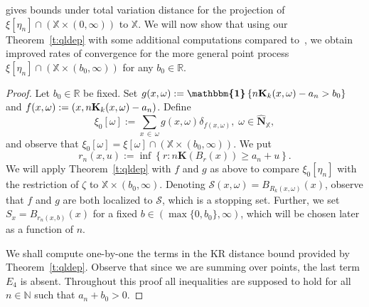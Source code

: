 \documentclass[10pt]{amsart}
\theoremstyle{definition}\newtheorem{defi}[theo]{Definition}\newtheorem{rema}[theo]{Remark}\newtheorem{exam}[theo]{Example}\newtheorem{exem}[theo]{Example}\newtheorem{nota}[theo]{Notation}
\newcommand*\bN{\mathbf{N}}
\newcommand*\bK{\mathbf{K}}
\newcommand*\N{\mathbb{N}}
\newcommand*\R{\mathbb{R}}
\newcommand*\X{\mathbb{X}}
\newcommand*\cS{\mathcal{S}}
\newcommand{\ind}{\boldsymbol{\mathbbm{1}}}
\newcommand{\set}[1]{\left\{#1\right\}}
\begin{document}
\cite[Theorem~4.2]{Otto2020} gives bounds under total variation distance for the projection of $\xi[\eta_n] \cap (\X \times (0,\infty))$ to $\X$. We will now show that using our Theorem~\ref{t:qldep} with some additional computations compared to~\cite[Theorem~4.2]{Otto2020}, we obtain improved rates of convergence for the more general point process $\xi[\eta_n] \cap (\X \times (b_0,\infty))$ for any $b_0 \in \R$.


\begin{proof}
Let $b_0 \in \R$ be fixed. Set $g(x,\omega) := \ind\set{n\bK_k(x,\omega) - a_n > b_0}$ and $f(x,\omega)\linebreak := (x, n\bK_k(x,\omega) - a_n)$. Define
\[
\xi_0[\omega] := \sum_{x\,\in\,\omega} g(x,\omega)\delta_{f(x,\omega)}, \; \omega \in \widehat{\bN}_{\X},
\]
and observe that $\xi_0[\omega] = \xi[\omega] \cap (\X \times (b_0,\infty)).$ We put
\[
r_n(x,u) := \inf \left\{r : n\bK(B_r(x)) \geq a_n + u \right\}.
\]
We will apply Theorem~\ref{t:qldep} with $f$ and $g$ as above to compare {$\xi_0[\eta_n]$ with the restriction of $\zeta$ to $\X\times (b_0,\infty)$.} Denoting $\cS(x,\omega) = B_{R_k(x,\omega)}(x)$, observe that {$f$ and $g$ are both localized to $\cS$,} which is a stopping set. Further, we set $S_x = B_{r_n(x,b)}(x)$ for a fixed {$b\in(\max\{0,b_0\},\infty)$,} which will be chosen later as a function of $n$.

We shall compute one-by-one the terms in the KR distance bound provided by Theorem~\ref{t:qldep}. Observe that since we are summing over points, the last term $E_4$ is absent. Throughout this proof all inequalities are supposed to hold for all $n\in\N$ such that {$a_n+b_0>0$.}


\end{proof}
\end{document}
